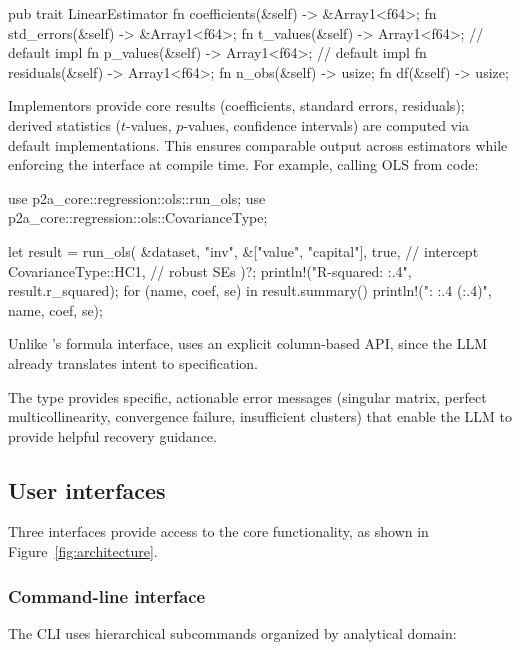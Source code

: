 \begin{Code}
pub trait LinearEstimator {
    fn coefficients(&self) -> &Array1<f64>;
    fn std_errors(&self) -> &Array1<f64>;
    fn t_values(&self) -> Array1<f64>;    // default impl
    fn p_values(&self) -> Array1<f64>;    // default impl
    fn residuals(&self) -> Array1<f64>;
    fn n_obs(&self) -> usize;
    fn df(&self) -> usize;
}
\end{Code}

\noindent Implementors provide core results (coefficients,
standard errors, residuals); derived statistics ($t$-values, $p$-values,
confidence intervals) are computed via default implementations. This ensures
comparable output across estimators while enforcing the interface at compile
time. For example, calling OLS from  code:

\begin{Code}
use p2a_core::regression::ols::run_ols;
use p2a_core::regression::ols::CovarianceType;

let result = run_ols(
    &dataset, "inv", &["value", "capital"],
    true,                    // intercept
    CovarianceType::HC1,     // robust SEs
)?;
println!("R-squared: {:.4}", result.r_squared);
for (name, coef, se) in result.summary() {
    println!("{}: {:.4} ({:.4})", name, coef, se);
}
\end{Code}

\noindent Unlike 's formula interface,  uses an explicit
column-based API, since the LLM already translates intent to specification.

The  type provides specific, actionable error messages
(singular matrix, perfect multicollinearity, convergence failure, insufficient
clusters) that enable the LLM to provide helpful recovery guidance.

\subsection{User interfaces}

Three interfaces provide access to the core functionality, as shown in
Figure~\ref{fig:architecture}.

\subsubsection{Command-line interface}

The CLI uses hierarchical subcommands organized by analytical domain:

